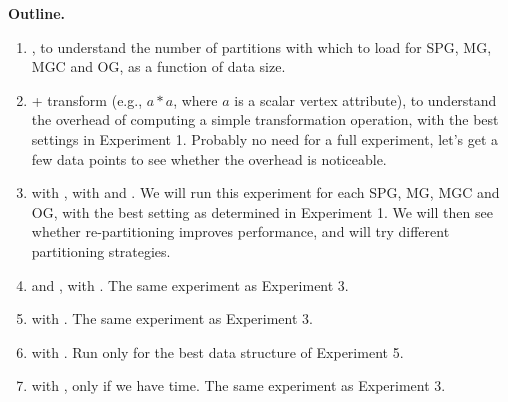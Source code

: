 {\bf Outline.}


\begin{enumerate}

\item {}, to understand the number of
  partitions with which to load for SPG, MG, MGC and OG, as a function
  of data size.

\item {} + transform (e.g., $a * a$, where $a$ is a
  scalar vertex attribute), to understand the overhead of computing a
  simple transformation operation, with the best settings in
  Experiment 1.  Probably no need for a full experiment,
  let's get a few data points to see whether the overhead is
  noticeable.

\item {} with , with
   and .  We will run this experiment for each
  SPG, MG, MGC and OG, with the best setting as determined in
  Experiment 1.  We will then see whether re-partitioning improves
  performance, and will try different partitioning strategies.

\item {} and ,  with .  The
  same experiment as Experiment 3.

\item {} with . The same
  experiment as Experiment 3.

\item {} with .  Run only for the best
  data structure of Experiment 5.

\item {} with , only if we have time. The
  same experiment as Experiment 3.

\end{enumerate}
